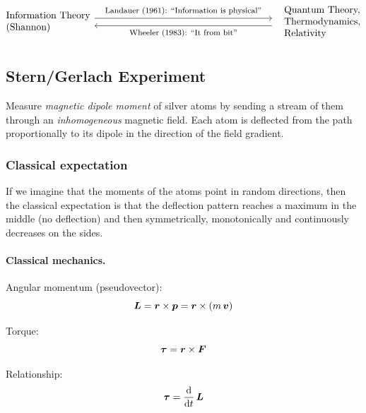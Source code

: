 \[
\begin{tikzpicture}[scale=0.8, ]
  \node[align=left, anchor=west, outer sep=0pt, inner sep=0pt] (L) at (0,0) {Information Theory\\(Shannon)};
  \node[align=left, anchor=east, outer sep=0pt, inner sep=0pt] (R) at (16,0) {Quantum Theory,\\Thermodynamics,\\Relativity};
  \draw[->] (4.0,0.17) -- node[midway,above]{\footnotesize Landauer (1961): ``Information is physical''} (12,0.17);
  \draw[<-] (4.0,-0.17) -- node[midway,below]{\footnotesize Wheeler (1983): ``It from bit''} (12,-0.17);
\end{tikzpicture}
\]


\subsection{Stern/Gerlach Experiment}\label{sec:stern-gerlach-experiment}

Measure \emph{magnetic dipole moment} of silver atoms by sending a stream of them through an \emph{inhomogeneous} magnetic field.  Each atom is deflected from the path proportionally to its dipole in the direction of the field gradient.

\subsubsection{Classical expectation}

If we imagine that the moments of the atoms point in random directions, then the classical expectation is that the deflection pattern reaches a maximum in the middle (no deflection) and then symmetrically, monotonically and continuously decreases on the sides.

\paragraph{\textbf{Classical mechanics.}}

Angular momentum (pseudovector):
\[
{\boldsymbol{L}} = {\boldsymbol{r}} \times {\boldsymbol{p}} = {\boldsymbol{r}} \times (m\,{\boldsymbol{v}})
\]

Torque:
\[
{\boldsymbol{\tau}} = {\boldsymbol{r}} \times {\boldsymbol{F}}
\]

Relationship:
\begin{equation}\label{eq:tau_L}
{\boldsymbol{\tau}} = \frac{\mathrm{d}}{\mathrm{d} t}\,{\boldsymbol{L}}
\end{equation}

